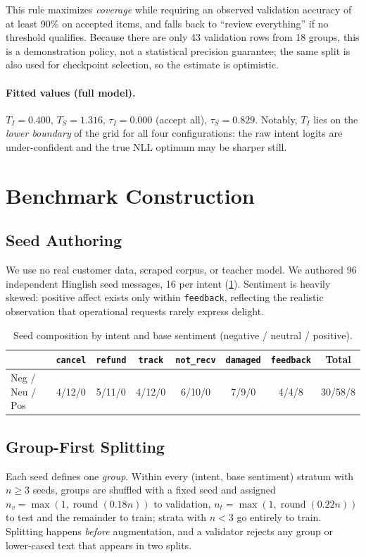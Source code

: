 \documentclass[11pt,a4paper]{article}
\theoremstyle{remark}
\newcommand{\lbl}[1]{\texttt{#1}}                      %
\begin{document}
This rule maximizes \emph{coverage} while requiring an observed validation accuracy
of at least 90\% on accepted items, and falls back to ``review everything'' if
no threshold qualifies. Because there are only 43 validation rows from 18 groups, this is a
demonstration policy, not a statistical precision guarantee; the same split
is also used for checkpoint selection, so the estimate is optimistic.

\paragraph{Fitted values (full model).} $T_I=0.400$, $T_S=1.316$,
$\tau_I=0.000$ (accept all), $\tau_S=0.829$. Notably, $T_I$ lies on the
\emph{lower boundary} of the grid for all four configurations: the raw intent
logits are under-confident and the true NLL optimum may be sharper still.

\section{Benchmark Construction}
\label{sec:data}

\subsection{Seed Authoring}
We use no real customer data, scraped corpus, or teacher model. We authored
96 independent Hinglish seed messages, 16 per intent
(\cref{tab:seeds}). Sentiment is heavily skewed: positive affect exists
only within \lbl{feedback}, reflecting the realistic observation that
operational requests rarely express delight.

\begin{table}[h]
\centering\small
\caption{Seed composition by intent and base sentiment (negative / neutral / positive).}
\label{tab:seeds}
\begin{tabular}{@{}lcccccc|c@{}}
\toprule
 & \lbl{cancel} & \lbl{refund} & \lbl{track} & \lbl{not\_recv} & \lbl{damaged} & \lbl{feedback} & Total \\
\midrule
Neg / Neu / Pos & 4/12/0 & 5/11/0 & 4/12/0 & 6/10/0 & 7/9/0 & 4/4/8 & 30/58/8 \\
\bottomrule
\end{tabular}
\end{table}

\subsection{Group-First Splitting}
Each seed defines one \emph{group}. Within every (intent, base sentiment) stratum
with $n\ge3$ seeds, groups are shuffled with a fixed seed and assigned
$n_v=\max(1,\operatorname{round}(0.18n))$ to validation,
$n_t=\max(1,\operatorname{round}(0.22n))$ to test and the remainder to train;
strata with $n<3$ go entirely to train. Splitting happens \emph{before}
augmentation, and a validator rejects any group or lower-cased text that
appears in two splits.
\end{document}
